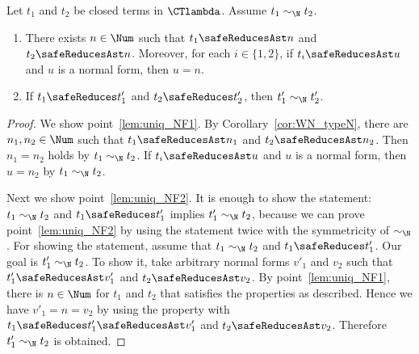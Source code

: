 \begin{lemma}\label{lem:uniq_NF}
  Let $t_1$ and $t_2$ be closed terms in $\CTlambda$. 
  Assume $t_1 \sim_\N t_2$. 
  \begin{enumerate}
  \item\label{lem:uniq_NF1}
    There exists $n \in \Num$ such that $t_1 \safeReducesAst n$ and $t_2 \safeReducesAst n$.
    Moreover, for each $i\in \{1,2\}$, if $t_i \safeReducesAst u$ and $u$ is a normal form, then $u = n$. 
  \item\label{lem:uniq_NF2}
    If $t_1 \safeReduces t'_1$ and $t_2 \safeReduces t'_2$, then $t'_1 \sim_\N t'_2$. 
  \end{enumerate}
  
\end{lemma}
\begin{proof}
  We show point~\ref{lem:uniq_NF1}. 
  By Corollary~\ref{cor:WN_typeN}, there are $n_1,n_2 \in \Num$ such that
  $t_1 \safeReducesAst n_1$ and $t_2\safeReducesAst n_2$.
  Then $n_1=n_2$ holds by $t_1\sim_\N t_2$. 
  If $t_i \safeReducesAst u$ and $u$ is a normal form, then $u = n_2$ by $t_1\sim_\N t_2$.

  Next we show point~\ref{lem:uniq_NF2}.
  It is enough to show the statement: $t_1\sim_\N t_2$ and $t_1 \safeReduces t'_1$ implies $t'_1 \sim_\N t_2$,
  because we can prove point~\ref{lem:uniq_NF2} by using the statement twice with the symmetricity of $\sim_\N$. 
  For showing the statement, assume that $t_1\sim_\N t_2$ and $t_1 \safeReduces t'_1$. Our goal is $t'_1 \sim_\N t_2$. 
  To show it, take arbitrary normal forms $v'_1$ and $v_2$ such that $t'_1 \safeReducesAst v'_1$ and $t_2 \safeReducesAst v_2$.
  By point~\ref{lem:uniq_NF1}, there is $n\in\Num$ for $t_1$ and $t_2$ that satisfies the properties as described.
  Hence we have $v'_1 = n = v_2$ by using the property with $t_1 \safeReduces t'_1 \safeReducesAst v'_1$ and $t_2 \safeReducesAst v_2$. 
  Therefore $t'_1 \sim_\N t_2$ is obtained. 
\end{proof}



